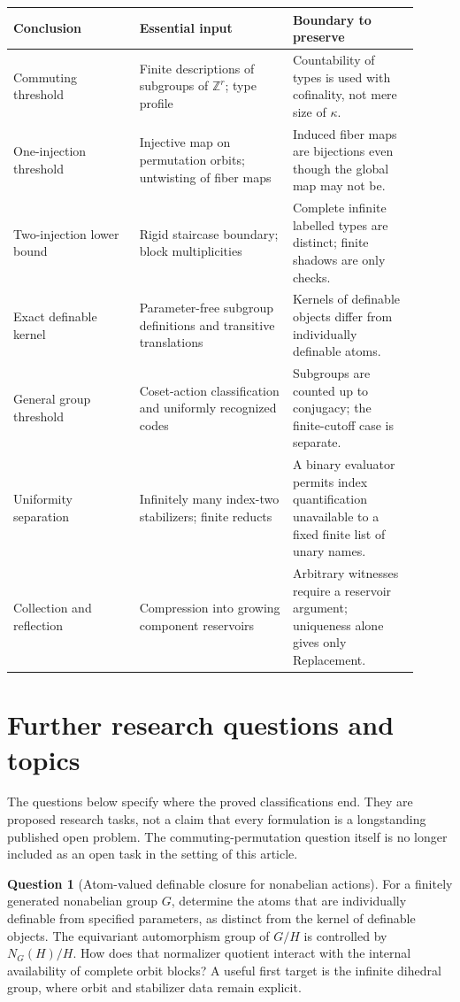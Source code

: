 \documentclass[11pt,letterpaper]{article}
\numberwithin{equation}{section}
\theoremstyle{plain}
\theoremstyle{definition}
\newtheorem{question}[question]{Question}
\theoremstyle{remark}
\newcommand{\ZZ}{\mathbb Z}
\begin{document}
\begin{longtable}{@{}L{0.28\linewidth}L{0.34\linewidth}L{0.29\linewidth}@{}}
\toprule
Conclusion & Essential input & Boundary to preserve \\
\midrule
\endhead
Commuting threshold & Finite descriptions of subgroups of $\ZZ^r$; type profile & Countability of types is used with cofinality, not mere size of $\kappa$. \\[5pt]
One-injection threshold & Injective map on permutation orbits; untwisting of fiber maps & Induced fiber maps are bijections even though the global map may not be. \\[5pt]
Two-injection lower bound & Rigid staircase boundary; block multiplicities & Complete infinite labelled types are distinct; finite shadows are only checks. \\[5pt]
Exact definable kernel & Parameter-free subgroup definitions and transitive translations & Kernels of definable objects differ from individually definable atoms. \\[5pt]
General group threshold & Coset-action classification and uniformly recognized codes & Subgroups are counted up to conjugacy; the finite-cutoff case is separate. \\[5pt]
Uniformity separation & Infinitely many index-two stabilizers; finite reducts & A binary evaluator permits index quantification unavailable to a fixed finite list of unary names. \\[5pt]
Collection and reflection & Compression into growing component reservoirs & Arbitrary witnesses require a reservoir argument; uniqueness alone gives only Replacement. \\
\bottomrule
\end{longtable}

\section{Further research questions and topics}\label{nee:ca:sec:future}

The questions below specify where the proved classifications end. They are proposed research tasks, not a claim that every formulation is a longstanding published open problem. The commuting-permutation question itself is no longer included as an open task in the setting of this article.

\begin{question}[Atom-valued definable closure for nonabelian actions]\label{nee:ca:q:nonabelian}
For a finitely generated nonabelian group $G$, determine the atoms that are individually definable from specified parameters, as distinct from the kernel of definable objects. The equivariant automorphism group of $G/H$ is controlled by $N_G(H)/H$. How does that normalizer quotient interact with the internal availability of complete orbit blocks? A useful first target is the infinite dihedral group, where orbit and stabilizer data remain explicit.
\end{question}
\end{document}
